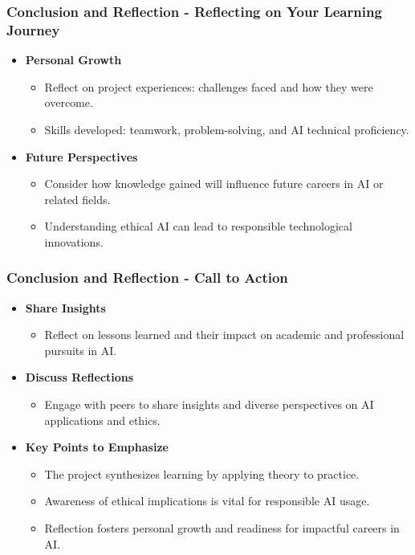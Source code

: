\documentclass[aspectratio=169]{beamer}
\begin{document}
\begin{frame}[fragile]
  \frametitle{Conclusion and Reflection - Reflecting on Your Learning Journey}
  \begin{itemize}
    \item \textbf{Personal Growth}
      \begin{itemize}
        \item Reflect on project experiences: challenges faced and how they were overcome.
        \item Skills developed: teamwork, problem-solving, and AI technical proficiency.
      \end{itemize}
    
    \item \textbf{Future Perspectives}
      \begin{itemize}
        \item Consider how knowledge gained will influence future careers in AI or related fields.
        \item Understanding ethical AI can lead to responsible technological innovations.
      \end{itemize}
  \end{itemize}  
\end{frame}

\begin{frame}[fragile]
  \frametitle{Conclusion and Reflection - Call to Action}
  \begin{itemize}
    \item \textbf{Share Insights}
      \begin{itemize}
        \item Reflect on lessons learned and their impact on academic and professional pursuits in AI.
      \end{itemize}
      
    \item \textbf{Discuss Reflections}
      \begin{itemize}
        \item Engage with peers to share insights and diverse perspectives on AI applications and ethics.
      \end{itemize}
      
    \item \textbf{Key Points to Emphasize}
      \begin{itemize}
        \item The project synthesizes learning by applying theory to practice.
        \item Awareness of ethical implications is vital for responsible AI usage.
        \item Reflection fosters personal growth and readiness for impactful careers in AI.
      \end{itemize}
  \end{itemize}
\end{frame}
\end{document}
